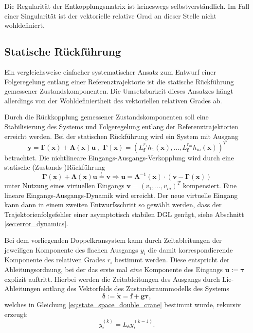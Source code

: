 Die Regularität der Entkopplungsmatrix ist keineswegs selbstverständlich. Im Fall einer Singularität ist der vektorielle relative Grad an dieser Stelle nicht wohldefiniert.

\subsection{Statische Rückführung}
\label{sec:static_state_feedback}
Ein vergleichsweise einfacher systematischer Ansatz zum Entwurf einer Folgeregelung entlang einer Referenztrajektorie ist die statische Rückführung gemessener Zustandskomponenten. Die Umsetzbarkeit dieses Ansatzes hängt allerdings von der Wohldefiniertheit des vektoriellen relativen Grades ab.

Durch die Rückkopplung gemessener Zustandskomponenten soll eine Stabilisierung des Systems und Folgeregelung entlang der Referenztrajektorien erreicht werden. Bei der statischen Rückführung wird ein System mit Ausgang
\begin{equation}
	\mathbf{y} = \boldsymbol{\Gamma}(\mathbf{x}) + \boldsymbol{\Lambda}(\mathbf{x}) \mathbf{u} \ \text{, } \ \boldsymbol{\Gamma}(\mathbf{x}) = (L_{\mathbf{f}}^{r_1} h_1(\mathbf{x}), ..., L_{\mathbf{f}}^{r_m} h_m(\mathbf{x}))^T
\end{equation}
betrachtet. Die nichtlineare Eingangs-Ausgangs-Verkopplung wird durch eine statische (Zustands-)Rückführung
\begin{equation}
	\label{eq:static_state_feedback}
	\boldsymbol{\Gamma}(\mathbf{x}) + \boldsymbol{\Lambda}(\mathbf{x}) \mathbf{u} \stackrel{!}{=} \mathbf{v} \Rightarrow \mathbf{u} = \boldsymbol{\Lambda}^{-1}(\mathbf{x}) \cdot (\mathbf{v} - \boldsymbol{\Gamma}(\mathbf{x}))
\end{equation}
unter Nutzung eines virtuellen Eingangs $\mathbf{v} = (v_1, ..., v_m)^T$ kompensiert. Eine lineare Eingangs-Ausgangs-Dynamik wird erreicht. Der neue virtuelle Eingang kann dann in einem zweiten Entwurfsschritt so gewählt werden, dass der Trajektorienfolgefehler einer asymptotisch stabilen DGL genügt, siehe Abschnitt \ref{sec:error_dynamics}. \cite[S. 195]{NLRT_Roebenack}

Bei dem vorliegenden Doppelkransystem kann durch Zeitableitungen der jeweiligen Komponente des flachen Ausgangs $y_i$ die damit korrespondierende Komponente des relativen Grades $r_i$ bestimmt werden. Diese entspricht der Ableitungsordnung, bei der das erste mal \textit{eine} Komponente des Eingangs $\mathbf{u}:=\boldsymbol{\tau}$ explizit auftritt. Hierbei werden die Zeitableitungen des Ausgangs durch Lie-Ableitungen entlang des Vektorfelds des Zustandsraummodells des Systems 
\begin{equation}
	\label{eq:state_space_vf}
	\boldsymbol{\delta} := \dot{\mathbf{x}} = \mathbf{f} + \mathbf{g} \boldsymbol{\tau},
\end{equation}
welches in Gleichung \eqref{eq:state_space_double_crane} bestimmt wurde, rekursiv erzeugt: 
\begin{equation}
	\label{eq:Lie_time_deriv}
	y_i^{(k)} = L_{\boldsymbol{\delta}} y_i^{(k-1)} .
\end{equation}

